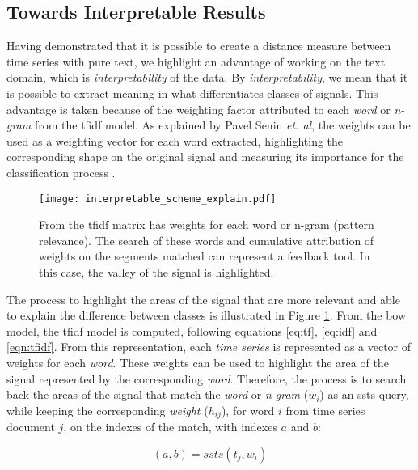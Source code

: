 \subsection{Towards Interpretable Results}

Having demonstrated that it is possible to create a distance measure between time series with pure text, we highlight an advantage of working on the text domain, which is \textit{interpretability} of the data. By \textit{interpretability}, we mean that it is possible to extract meaning in what differentiates classes of signals. This advantage is taken because of the weighting factor attributed to each \textit{word} or \textit{n-gram} from the \gls{tfidf} model. As explained by Pavel Senin \textit{et. al}, the weights can be used as a weighting vector for each word extracted, highlighting the corresponding shape on the original signal and measuring its importance for the classification process \cite{sax_vsm}.

\begin{figure}
    \centering
    \texttt{[image: interpretable\_scheme\_explain.pdf]}
    \caption{From the \gls{tfidf} matrix has weights for each word or n-gram (pattern relevance). The search of these words and cumulative attribution of weights on the segments matched can represent a feedback tool. In this case, the valley of the signal is highlighted.}
    \label{fig:interpretable_step}
\end{figure}


The process to highlight the areas of the signal that are more relevant and able to explain the difference between classes is illustrated in Figure \ref{fig:interpretable_step}. From the \gls{bow} model, the \gls{tfidf} model is computed, following equations \ref{eq:tf}, \ref{eq:idf} and \ref{eqn:tfidf}. From this representation, each \textit{time series} is represented as a vector of weights for each \textit{word}. These weights can be used to highlight the area of the signal represented by the corresponding \textit{word}. Therefore, the process is to search back the areas of the signal that match the \textit{word} or \textit{n-gram} ($w_i$) as an \gls{ssts} query, while keeping the corresponding \textit{weight} ($h_{ij}$), for word $i$ from time series document $j$, on the indexes of the match, with indexes $a$ and $b$:

\begin{equation}
(a,b) = ssts(t_j, w_i)
\end{equation}

